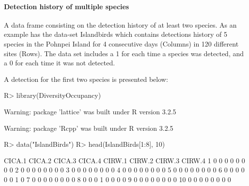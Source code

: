 \documentclass[article]{jss}
\begin{document}
\paragraph{Detection history of multiple
species}\label{detection-history-of-multiple-species}

A data frame consisting on the detection history of at least two
species. As an example  has the data-set
Islandbirds which contains detections history of 5 species in the
Pohnpei Island for 4 consecutive days (Columns) in 120 different sites
(Rows). The data set includes a 1 for each time a species was detected,
and a 0 for each time it was not detected.

A detection for the first two species is presented below:

\begin{CodeChunk}

\begin{CodeInput}
R> library(DiversityOccupancy)
\end{CodeInput}

\begin{CodeOutput}
Warning: package 'lattice' was built under R version 3.2.5
\end{CodeOutput}

\begin{CodeOutput}
Warning: package 'Rcpp' was built under R version 3.2.5
\end{CodeOutput}

\begin{CodeInput}
R> data("IslandBirds")
R> head(IslandBirds[1:8], 10)
\end{CodeInput}

\begin{CodeOutput}
   CICA.1 CICA.2 CICA.3 CICA.4 CIRW.1 CIRW.2 CIRW.3 CIRW.4
1       0      0      0      0      0      0      0      0
2       0      0      0      0      0      0      0      0
3       0      0      0      0      0      0      0      0
4       0      0      0      0      0      0      0      0
5       0      0      0      0      0      0      0      0
6       0      0      0      0      0      0      1      0
7       0      0      0      0      0      0      0      0
8       0      0      0      1      0      0      0      0
9       0      0      0      0      0      0      0      0
10      0      0      0      0      0      0      0      0
\end{CodeOutput}
\end{CodeChunk}
\end{document}
